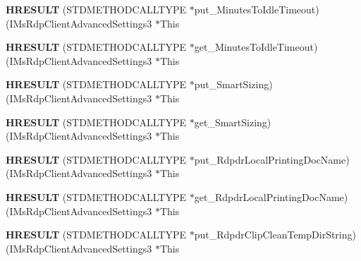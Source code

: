 \begin{DoxyCompactItemize}
{\bfseries H\+R\+E\+S\+U\+LT} (S\+T\+D\+M\+E\+T\+H\+O\+D\+C\+A\+L\+L\+T\+Y\+PE $\ast$put\+\_\+\+Minutes\+To\+Idle\+Timeout)(I\+Ms\+Rdp\+Client\+Advanced\+Settings3 $\ast$This
\item 
\mbox{\label{struct_i_ms_rdp_client_advanced_settings3_vtbl_aaeb05c959edcab0ae63a3f4e72edecc6}} 
{\bfseries H\+R\+E\+S\+U\+LT} (S\+T\+D\+M\+E\+T\+H\+O\+D\+C\+A\+L\+L\+T\+Y\+PE $\ast$get\+\_\+\+Minutes\+To\+Idle\+Timeout)(I\+Ms\+Rdp\+Client\+Advanced\+Settings3 $\ast$This
\item 
\mbox{\label{struct_i_ms_rdp_client_advanced_settings3_vtbl_a287512fce6bf0363d2995cbc64580097}} 
{\bfseries H\+R\+E\+S\+U\+LT} (S\+T\+D\+M\+E\+T\+H\+O\+D\+C\+A\+L\+L\+T\+Y\+PE $\ast$put\+\_\+\+Smart\+Sizing)(I\+Ms\+Rdp\+Client\+Advanced\+Settings3 $\ast$This
\item 
\mbox{\label{struct_i_ms_rdp_client_advanced_settings3_vtbl_a7d988ed69f7f479e2f39fbfac1ef1991}} 
{\bfseries H\+R\+E\+S\+U\+LT} (S\+T\+D\+M\+E\+T\+H\+O\+D\+C\+A\+L\+L\+T\+Y\+PE $\ast$get\+\_\+\+Smart\+Sizing)(I\+Ms\+Rdp\+Client\+Advanced\+Settings3 $\ast$This
\item 
\mbox{\label{struct_i_ms_rdp_client_advanced_settings3_vtbl_adcd0b79fb1172077b8ad6058b22fc055}} 
{\bfseries H\+R\+E\+S\+U\+LT} (S\+T\+D\+M\+E\+T\+H\+O\+D\+C\+A\+L\+L\+T\+Y\+PE $\ast$put\+\_\+\+Rdpdr\+Local\+Printing\+Doc\+Name)(I\+Ms\+Rdp\+Client\+Advanced\+Settings3 $\ast$This
\item 
\mbox{\label{struct_i_ms_rdp_client_advanced_settings3_vtbl_aac73475a8a1fa0673e26d1a905d6709d}} 
{\bfseries H\+R\+E\+S\+U\+LT} (S\+T\+D\+M\+E\+T\+H\+O\+D\+C\+A\+L\+L\+T\+Y\+PE $\ast$get\+\_\+\+Rdpdr\+Local\+Printing\+Doc\+Name)(I\+Ms\+Rdp\+Client\+Advanced\+Settings3 $\ast$This
\item 
\mbox{\label{struct_i_ms_rdp_client_advanced_settings3_vtbl_a78dc74500c7bf6c09ff104ae7d6afdba}} 
{\bfseries H\+R\+E\+S\+U\+LT} (S\+T\+D\+M\+E\+T\+H\+O\+D\+C\+A\+L\+L\+T\+Y\+PE $\ast$put\+\_\+\+Rdpdr\+Clip\+Clean\+Temp\+Dir\+String)(I\+Ms\+Rdp\+Client\+Advanced\+Settings3 $\ast$This

\end{DoxyCompactItemize}
